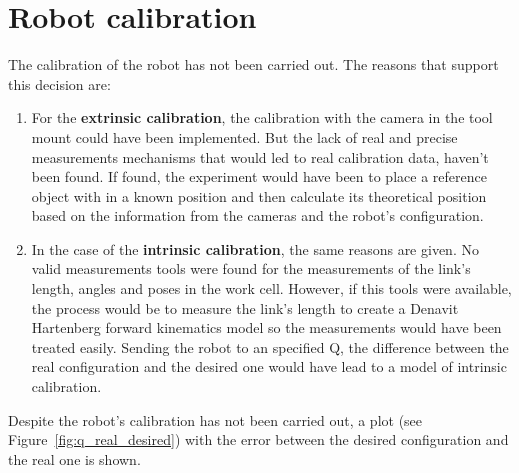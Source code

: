 \section{Robot calibration} %
\label{sec:robot_calibration}
The calibration of the robot has not been carried out. The reasons that support this decision are:
\begin{enumerate}
	\item For the \textbf{extrinsic calibration}, the calibration with the camera in the tool mount could have been implemented. But the lack of real and precise measurements mechanisms that would led to real calibration data, haven't been found. If found, the experiment would have been to place a reference object with in a known position and then calculate its theoretical position based on the information from the cameras and the robot's configuration.
	\item In the case of the \textbf{intrinsic calibration}, the same reasons are given. No valid measurements tools were found for the measurements of the link's length, angles and poses in the work cell. However, if this tools were available, the process would be to measure the link's length to create a Denavit Hartenberg forward kinematics model so the measurements would have been treated easily. Sending the robot to an specified Q, the difference between the real configuration and the desired one would have lead to a model of intrinsic calibration.
\end{enumerate}

Despite the robot's calibration has not been carried out, a plot (see Figure~\ref{fig:q_real_desired}) with the error between the desired configuration and the real one is shown.

